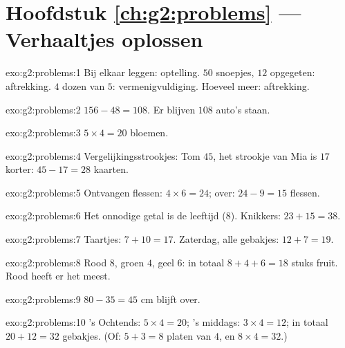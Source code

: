 \section*{Hoofdstuk \ref{ch:g2:problems} --- Verhaaltjes oplossen}

\begin{solution}{exo:g2:problems:1}
Bij elkaar leggen: optelling. $50$ snoepjes, $12$ opgegeten: aftrekking.
$4$ dozen van $5$: vermenigvuldiging. Hoeveel meer: aftrekking.
\end{solution}

\begin{solution}{exo:g2:problems:2}
$156 - 48 = 108$. Er blijven $108$ auto's staan.
\end{solution}

\begin{solution}{exo:g2:problems:3}
$5 \times 4 = 20$ bloemen.
\end{solution}

\begin{solution}{exo:g2:problems:4}
Vergelijkingsstrookjes: Tom $45$, het strookje van Mia is $17$ korter:
$45 - 17 = 28$ kaarten.
\end{solution}

\begin{solution}{exo:g2:problems:5}
Ontvangen flessen: $4 \times 6 = 24$; over: $24 - 9 = 15$ flessen.
\end{solution}

\begin{solution}{exo:g2:problems:6}
Het onnodige getal is de leeftijd ($8$). Knikkers: $23 + 15 = 38$.
\end{solution}

\begin{solution}{exo:g2:problems:7}
Taartjes: $7 + 10 = 17$. Zaterdag, alle gebakjes: $12 + 7 = 19$.
\end{solution}

\begin{solution}{exo:g2:problems:8}
Rood $8$, groen $4$, geel $6$: in totaal $8 + 4 + 6 = 18$ stuks fruit.
Rood heeft er het meest.
\end{solution}

\begin{solution}{exo:g2:problems:9}
$80 - 35 = 45$ cm blijft over.
\end{solution}

\begin{solution}{exo:g2:problems:10}
's Ochtends: $5 \times 4 = 20$; 's middags: $3 \times 4 = 12$; in totaal
$20 + 12 = 32$ gebakjes. (Of: $5 + 3 = 8$ platen van $4$, en
$8 \times 4 = 32$.)
\end{solution}
